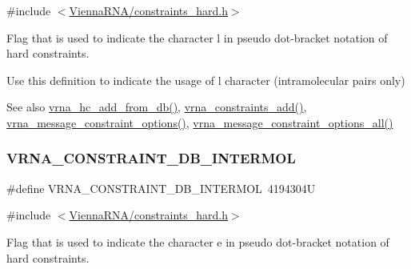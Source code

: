 {\ttfamily \#include $<$\mbox{\hyperlink{constraints__hard_8h}{Vienna\+R\+N\+A/constraints\+\_\+hard.\+h}}$>$}



Flag that is used to indicate the character \textquotesingle{}l\textquotesingle{} in pseudo dot-\/bracket notation of hard constraints. 

Use this definition to indicate the usage of \textquotesingle{}l\textquotesingle{} character (intramolecular pairs only)

\begin{DoxySeeAlso}{See also}
\mbox{\hyperlink{group__hard__constraints_ga5b4de3247b67358080c176b94591a8e6}{vrna\+\_\+hc\+\_\+add\+\_\+from\+\_\+db()}}, \mbox{\hyperlink{group__constraints_ga35a401f680969a556858a8dd5f1d07cc}{vrna\+\_\+constraints\+\_\+add()}}, \mbox{\hyperlink{group__constraints_gaa1f20b53bf09ac2e6b0dbb13f7d89670}{vrna\+\_\+message\+\_\+constraint\+\_\+options()}}, \mbox{\hyperlink{group__constraints_gaec7e13fa0465c2acc7a621d1aecb709f}{vrna\+\_\+message\+\_\+constraint\+\_\+options\+\_\+all()}} 
\end{DoxySeeAlso}
\mbox{\label{group__hard__constraints_ga31d0ebb9755ca8a4acafc14f00ca755d}} 
\subsubsection{\texorpdfstring{V\+R\+N\+A\+\_\+\+C\+O\+N\+S\+T\+R\+A\+I\+N\+T\+\_\+\+D\+B\+\_\+\+I\+N\+T\+E\+R\+M\+OL}{VRNA\_CONSTRAINT\_DB\_INTERMOL}}
{\footnotesize\ttfamily \#define V\+R\+N\+A\+\_\+\+C\+O\+N\+S\+T\+R\+A\+I\+N\+T\+\_\+\+D\+B\+\_\+\+I\+N\+T\+E\+R\+M\+OL~4194304U}



{\ttfamily \#include $<$\mbox{\hyperlink{constraints__hard_8h}{Vienna\+R\+N\+A/constraints\+\_\+hard.\+h}}$>$}



Flag that is used to indicate the character \textquotesingle{}e\textquotesingle{} in pseudo dot-\/bracket notation of hard constraints. 

